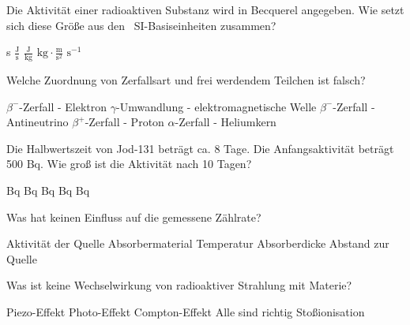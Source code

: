 \documentclass[11pt]{exam}
\begin{document}
\setlength{\voffset}{-0.5in}
\setlength{\headsep}{5pt}

\hspace{2mm}
 \hspace{5mm}
\vspace{4mm}

\begin{questions}

\question Die Aktivität einer radioaktiven Substanz wird in Becquerel angegeben. Wie setzt sich diese Größe aus den  SI-Basiseinheiten zusammen?

\begin{choices}
	\choice s
	\choice \( \frac{\text{J}}{\text{s}} \)
	\choice \( \frac{\text{J}}{\text{kg}} \)
	\choice \( \text{kg}\cdot\frac{\text{m}}{\text{s}^2} \)
	\choice \( \text{s}^{-1} \)
\end{choices}

\vspace{3mm}\question Welche Zuordnung von Zerfallsart und frei werdendem Teilchen ist falsch?

\begin{choices}
	\choice \( \beta^- \)-Zerfall - Elektron
	\choice \( \gamma \)-Umwandlung - elektromagnetische Welle
	\choice \( \beta^- \)-Zerfall - Antineutrino
	\choice \( \beta^+ \)-Zerfall - Proton
	\choice \( \alpha \)-Zerfall - Heliumkern
\end{choices}

\vspace{3mm}\question Die Halbwertszeit von Jod-131 beträgt ca. 8 Tage. Die Anfangsaktivität beträgt 500 Bq. Wie groß ist die Aktivität nach 10 Tagen?

\begin{choices}
	 Bq
	 Bq
	 Bq
	 Bq
	 Bq
\end{choices}

\vspace{3mm}\question Was hat keinen Einfluss auf die gemessene Zählrate?

\begin{choices}
	\choice Aktivität der Quelle
	\choice Absorbermaterial
	\choice Temperatur
	\choice Absorberdicke
	\choice Abstand zur Quelle
\end{choices}

\vspace{3mm}\question Was ist keine Wechselwirkung von radioaktiver Strahlung mit Materie?

\begin{choices}
	\choice Piezo-Effekt
	\choice Photo-Effekt
	\choice Compton-Effekt
	\choice Alle sind richtig
	\choice Stoßionisation
\end{choices}

\vspace{3mm}\end{questions}
\end{document}
